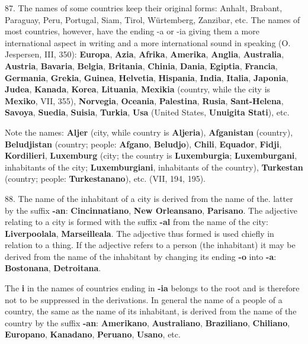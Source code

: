 87. The names of some countries keep their original forms: Anhalt, Brabant, Paraguay, Peru, Portugal, Siam, Tirol, Würtemberg, Zanzibar, etc. The names of most countries, however, have the ending -a or -ia giving them a more international aspect in writing and a more international sound in speaking (O. Jespersen, III, 350): \textbf{Europa}, \textbf{Azia}, \textbf{Afrika}, \textbf{Amerika}, \textbf{Anglia}, \textbf{Australia}, \textbf{Austria}, \textbf{Bavaria}, \textbf{Belgia}, \textbf{Britania}, \textbf{Chinia}, \textbf{Dania}, \textbf{Egiptia}, \textbf{Francia}, \textbf{Germania}, \textbf{Grekia}, \textbf{Guinea}, \textbf{Helvetia}, \textbf{Hispania}, \textbf{India}, \textbf{Italia}, \textbf{Japonia}, \textbf{Judea}, \textbf{Kanada}, \textbf{Korea}, \textbf{Lituania}, \textbf{Mexikia} (country, while the city is \textbf{Mexiko}, VII, 355), \textbf{Norvegia}, \textbf{Oceania}, \textbf{Palestina}, \textbf{Rusia}, \textbf{Sant-Helena}, \textbf{Savoya}, \textbf{Suedia}, \textbf{Suisia}, \textbf{Turkia}, \textbf{Usa} (United States, \textbf{Unuigita Stati}), etc. 

Note the names: \textbf{Aljer} (city, while country is \textbf{Aljeria}), \textbf{Afganistan} (country), \textbf{Beludjistan} (country; people: \textbf{Afgano}, \textbf{Beludjo}), \textbf{Chili}, \textbf{Equador}, \textbf{Fidji}, \textbf{Kordilieri}, \textbf{Luxemburg} (city; the country is \textbf{Luxemburgia}; \textbf{Luxemburgani}, inhabitants of the city; \textbf{Luxemburgiani}, inhabitants of the country), \textbf{Turkestan} (country; people: \textbf{Turkestanano}), etc. (VII, 194, 195). 

88. The name of the inhabitant of a city is derived from the name of the. latter by the suffix \textbf{-an}: \textbf{Cincinnatiano}, \textbf{New Orleansano}, \textbf{Parisano}. The adjective relating to a city is formed with the suffix \textbf{-al} from the name of the city: \textbf{Liverpoolala}, \textbf{Marseilleala}. The adjective thus formed is used chiefly in relation to a thing. If the adjective refers to a person (the inhabitant) it may be derived from the name of the inhabitant by changing its ending \textbf{-o} into \textbf{-a}: \textbf{Bostonana}, \textbf{Detroitana}. 

The \textbf{i} in the names of countries ending in \textbf{-ia} belongs to the root and is therefore not to be suppressed in the derivations. In general the name of a people of a country, the same as the name of its inhabitant, is derived from the name of the country by the suffix \textbf{-an}: \textbf{Amerikano}, \textbf{Australiano}, \textbf{Braziliano}, \textbf{Chiliano}, \textbf{Europano}, \textbf{Kanadano}, \textbf{Peruano}, \textbf{Usano}, etc. 

